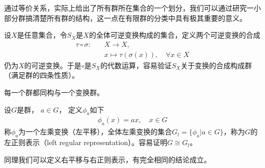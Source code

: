 \begin{note}
	通过等价关系，实际上给出了所有群所在集合的一个划分，我们可以通过研究一小部分群搞清楚所有群的结构，这一点在有限群的分类中具有极其重要的意义。
\end{note}
\medskip
设$X$是任意集合，令$S_X$是$X$的全体可逆变换构成的集合，定义两个可逆变换的合成
\begin{equation*}
\begin{split}
	\tau\circ \sigma:\quad &X\rightarrow X,\\
	&x \mapsto \tau(\sigma(x)),\quad \forall x\in X
\end{split}
\end{equation*}
仍为$X$的可逆变换。于是$\circ$是$S_X$的代数运算，容易验证$S_X$关于变换的合成构成群（满足群的四条性质）。
\medskip
\begin{theorem}[Cayley定理]
	每一个群都同构与一个变换群。
\end{theorem}
设$G$是群， $a\in G$， 定义$\phi_a$如下
\begin{equation*}
	\begin{split}
		\phi_a(x) = ax, \quad x\in G
	\end{split}
\end{equation*}
称$\phi_a$为一个左乘变换（左平移），全体左乘变换的集合$G_l = \{\phi_a|a\in G\}$，称为$G$的左正则表示（left regular representation）。容易证明$G\cong G_l$。
\begin{note}
	同理我们可以定义右平移与右正则表示，有完全相同的结论成立。	
\end{note}
